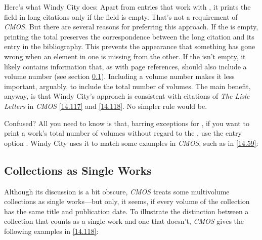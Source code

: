 \documentclass[11pt,letterpaper,oneside]{article}
\begin{document}
Here's what Windy City does: Apart from entries that work with
, it prints the  field in long
citations only if the  field is empty. That's not a
requirement of \textit{CMOS}. But there are several reasons for
preferring this approach. If the  is empty,
printing the total preserves the correspondence between the long
citation and its entry in the bibliography. This prevents the
appearance that something has gone wrong when an element in one is
missing from the other. If the  isn't empty, it
likely contains information that, as with page references, should also
include a volume number (see section \ref{multivolume}). Including a
volume number makes it less important, arguably, to include the total
number of volumes. The main benefit, anyway, is that Windy City's
approach is consistent with citations of \textit{The Lisle Letters} in
\textit{CMOS} \ref{14.117} and \ref{14.118}. No simpler rule would be.

Confused? All you need to know is that, barring exceptions for
, if you want to print a work's total number of volumes
without regard to the , use the entry option
. Windy City uses it to match some examples in
\textit{CMOS}, such as in \ref{14.59}:

\begin{citenobib}
\item \cite[1:126]{shurtleff1853}
\end{citenobib}

\subsection{Collections as Single Works}
\label{multivolume}

Although its discussion is a bit obscure, \textit{CMOS} treats some
multivolume collections as single works---but only, it seems, if every
volume of the collection has the same title and publication date. To
illustrate the distinction between a collection that counts as a
single work and one that doesn't, \textit{CMOS} gives the following
examples in \ref{14.118}:

\begin{citenobib}
\item \cite[4:243]{byrne1981}
\item \cite*[32--33]{james1963.5}
\item \cite[4:245]{byrne1981}
\item \cite*[34]{james1963.5}
\end{citenobib}
\end{document}
